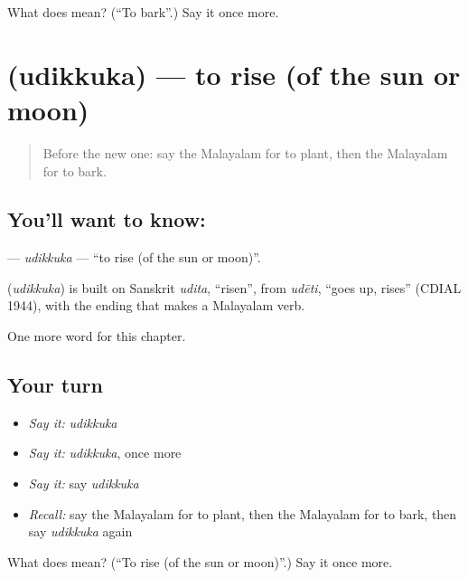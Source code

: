 \begin{tcolorbox}[breakable,colback=teal!4,colframe=teal!35!black,title={Before you move on}]
What does  mean? (\textquotedblleft{}To bark\textquotedblright{}.) Say it once more.
\end{tcolorbox}
\section[\texorpdfstring{\ml{ഉദിക്കുക} (udikkuka)}{ഉദിക്കുക (udikkuka)}]{ (udikkuka) — to rise (of the sun or moon)}

\label{lesson:ML-C187-udikkuka}



\begin{quote}
Before the new one: say the Malayalam for to plant, then the Malayalam for to bark.
\end{quote}

\subsection*{You'll want to know: }
\textbf{} — \emph{udikkuka} — \textquotedblleft{}to rise (of the sun or moon)\textquotedblright{}.

\begin{cousinweb}
\textbf{} (\emph{udikkuka}) is built on Sanskrit \emph{udita}, \textquotedblleft{}risen\textquotedblright{}, from \emph{udēti}, \textquotedblleft{}goes up, rises\textquotedblright{} (CDIAL 1944), with the ending that makes a Malayalam verb.
\end{cousinweb}

\begin{grammarlens}[title={What you've built}]
One more word for this chapter.
\end{grammarlens}

\subsection*{Your turn}
\begin{itemize}
\raggedright
  \item \emph{Say it:} \emph{udikkuka}
  \item \emph{Say it:} \emph{udikkuka}, once more
  \item \emph{Say it:} say \emph{udikkuka}
  \item \emph{Recall:} say the Malayalam for to plant, then the Malayalam for to bark, then say \emph{udikkuka} again
\end{itemize}

\begin{tcolorbox}[breakable,colback=teal!4,colframe=teal!35!black,title={Before you move on}]
What does  mean? (\textquotedblleft{}To rise (of the sun or moon)\textquotedblright{}.) Say it once more.
\end{tcolorbox}

